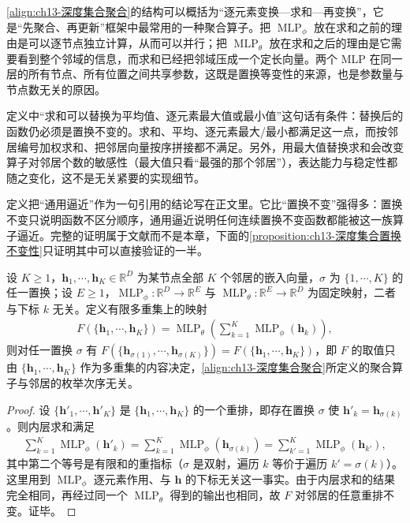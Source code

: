 \documentclass[../../main.tex]{subfiles}
\begin{document}
\begin{remark}
\eqref{align:ch13-深度集合聚合}的结构可以概括为“逐元素变换—求和—再变换”，它是“先聚合、再更新”框架中最常用的一种聚合算子。把 $\operatorname{MLP}_\phi$ 放在求和之前的理由是可以逐节点独立计算，从而可以并行；把 $\operatorname{MLP}_\theta$ 放在求和之后的理由是它需要看到整个邻域的信息，而求和已经把邻域压成一个定长向量。两个 MLP 在同一层的所有节点、所有位置之间共享参数，这既是置换等变性的来源，也是参数量与节点数无关的原因。\par
定义中“求和可以替换为平均值、逐元素最大值或最小值”这句话有条件：替换后的函数仍必须是置换不变的。求和、平均、逐元素最大/最小都满足这一点，而按邻居编号加权求和、把邻居向量按序拼接都不满足。另外，用最大值替换求和会改变算子对邻居个数的敏感性（最大值只看“最强的那个邻居”），表达能力与稳定性都随之变化，这不是无关紧要的实现细节。\par
定义把“通用逼近”作为一句引用的结论写在正文里。它比“置换不变”强得多：置换不变只说明函数不区分顺序，通用逼近说明任何连续置换不变函数都能被这一族算子逼近。完整的证明属于文献而不是本章，下面的\cref{proposition:ch13-深度集合置换不变性}只证明其中可以直接验证的一半。
\end{remark}

\begin{proposition}[深度集合聚合的置换不变性]\label{proposition:ch13-深度集合置换不变性}
设 $K\geqslant1$，$\bm{h}_1,\cdots,\bm{h}_K\in\mathbb{R}^{D}$ 为某节点全部 $K$ 个邻居的嵌入向量，$\sigma$ 为 $\{1,\cdots,K\}$ 的任一置换；设 $E\geqslant1$，$\operatorname{MLP}_\phi:\mathbb{R}^{D}\to\mathbb{R}^{E}$ 与 $\operatorname{MLP}_\theta:\mathbb{R}^{E}\to\mathbb{R}^{D}$ 为固定映射，二者与下标 $k$ 无关。定义有限多重集上的映射
\begin{align*}
F(\{\bm{h}_1,\cdots,\bm{h}_K\})=\operatorname{MLP}_\theta\!\left(\sum_{k=1}^{K}\operatorname{MLP}_\phi(\bm{h}_k)\right),
\end{align*}
则对任一置换 $\sigma$ 有 $F(\{\bm{h}_{\sigma(1)},\cdots,\bm{h}_{\sigma(K)}\})=F(\{\bm{h}_1,\cdots,\bm{h}_K\})$，即 $F$ 的取值只由 $\{\bm{h}_1,\cdots,\bm{h}_K\}$ 作为多重集的内容决定，\eqref{align:ch13-深度集合聚合}所定义的聚合算子与邻居的枚举次序无关。
\end{proposition}

\begin{proof}
设 $\{\bm{h}'_1,\cdots,\bm{h}'_K\}$ 是 $\{\bm{h}_1,\cdots,\bm{h}_K\}$ 的一个重排，即存在置换 $\sigma$ 使 $\bm{h}'_k=\bm{h}_{\sigma(k)}$。则内层求和满足
\begin{align*}
\sum_{k=1}^{K}\operatorname{MLP}_\phi(\bm{h}'_k)=\sum_{k=1}^{K}\operatorname{MLP}_\phi(\bm{h}_{\sigma(k)})=\sum_{k'=1}^{K}\operatorname{MLP}_\phi(\bm{h}_{k'}),
\end{align*}
其中第二个等号是有限和的重指标（$\sigma$ 是双射，遍历 $k$ 等价于遍历 $k'=\sigma(k)$）。这里用到 $\operatorname{MLP}_\phi$ 逐元素作用、与 $\bm{h}$ 的下标无关这一事实。由于内层求和的结果完全相同，再经过同一个 $\operatorname{MLP}_\theta$ 得到的输出也相同，故 $F$ 对邻居的任意重排不变。证毕。
\end{proof}
\end{document}
